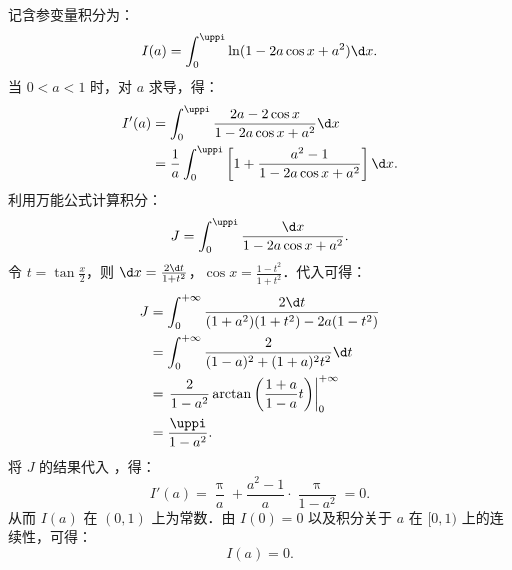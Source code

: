 \begin{solution}

    记含参变量积分为：
    \begin{equation}
        I(a) = \int_0^{\uppi} \ln(1 - 2a \cos x + a^2) \d x.
    \end{equation}
    当 $0 < a < 1$ 时，对 $a$ 求导，得：
    \begin{equation}\label{eq:int2-deriv}
        \begin{aligned}
            I'(a) & = \int_0^{\uppi} \frac{2a - 2\cos x}{1 - 2a \cos x + a^2} \d x                           \\
                  & = \frac{1}{a} \int_0^{\uppi} \left[ 1 + \frac{a^2 - 1}{1 - 2a\cos x + a^2} \right] \d x.
        \end{aligned}
    \end{equation}
    利用万能公式计算积分：
    \begin{equation}
        J = \int_0^{\uppi} \frac{\d x}{1 - 2a \cos x + a^2}.
    \end{equation}
    令 $t = \tan \frac{x}{2}$，则 $\d x = \frac{2\d t}{1 + t^2}$，$\cos x = \frac{1 - t^2}{1 + t^2}$．代入可得：
    \begin{equation}
        \begin{aligned}
            J & = \int_0^{+\infty} \frac{2\d t}{(1 + a^2)(1 + t^2) - 2a(1 - t^2)}                          \\
              & = \int_0^{+\infty} \frac{2}{(1 - a)^2 + (1 + a)^2 t^2} \d t                                \\
              & = \left. \frac{2}{1 - a^2} \arctan\left( \frac{1 + a}{1 - a} t \right) \right|_0^{+\infty} \\
              & = \frac{\uppi}{1 - a^2}.
        \end{aligned}
    \end{equation}
    将 $J$ 的结果代入 ，得：
    \begin{equation}
        I'(a) = \frac{\uppi}{a} + \frac{a^2 - 1}{a} \cdot \frac{\uppi}{1 - a^2} = 0.
    \end{equation}
    从而 $I(a)$ 在 $(0, 1)$ 上为常数．由 $I(0) = 0$ 以及积分关于 $a$ 在 $[0, 1)$ 上的连续性，可得：
    \begin{equation}
        \boxed{I(a) = 0}.
    \end{equation}



\end{solution}
